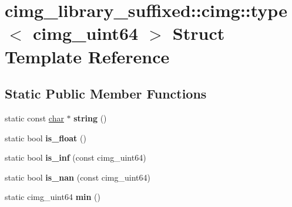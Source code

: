 \hypertarget{structcimg__library__suffixed_1_1cimg_1_1type_3_01cimg__uint64_01_4}{}\section{cimg\+\_\+library\+\_\+suffixed\+:\+:cimg\+:\+:type$<$ cimg\+\_\+uint64 $>$ Struct Template Reference}
\label{structcimg__library__suffixed_1_1cimg_1_1type_3_01cimg__uint64_01_4}
\subsection*{Static Public Member Functions}
\begin{DoxyCompactItemize}
\item 
\mbox{\label{structcimg__library__suffixed_1_1cimg_1_1type_3_01cimg__uint64_01_4_a41415d80d303dd8a06920690a78d9e67}} 
static const \hyperlink{classchar}{char} $\ast$ {\bfseries string} ()
\item 
\mbox{\label{structcimg__library__suffixed_1_1cimg_1_1type_3_01cimg__uint64_01_4_a27d0f216462a87c410051d5a56bce1c8}} 
static bool {\bfseries is\+\_\+float} ()
\item 
\mbox{\label{structcimg__library__suffixed_1_1cimg_1_1type_3_01cimg__uint64_01_4_a8379bef4592c774489723fb61356eea2}} 
static bool {\bfseries is\+\_\+inf} (const cimg\+\_\+uint64)
\item 
\mbox{\label{structcimg__library__suffixed_1_1cimg_1_1type_3_01cimg__uint64_01_4_a84025b7c9cadacb7d06585986e2c2c96}} 
static bool {\bfseries is\+\_\+nan} (const cimg\+\_\+uint64)
\item 
\mbox{\label{structcimg__library__suffixed_1_1cimg_1_1type_3_01cimg__uint64_01_4_ac72324c6cac679517fdaafe0e533407a}} 
static cimg\+\_\+uint64 {\bfseries min} ()
\item 
\mbox{\label{structcimg__library__suffixed_1_1cimg_1_1type_3_01cimg__uint64_01_4_a82aa05b958aae8ccaa959649d9884b2b}} 

\end{DoxyCompactItemize}
